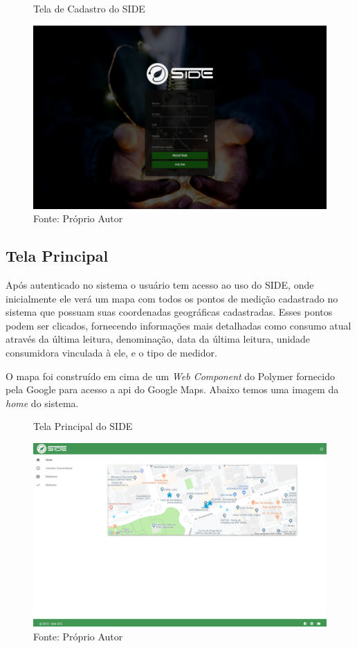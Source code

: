 \begin{figure}[H]
    \centering
    \caption{Tela de Cadastro do SIDE}
\includegraphics[width=0.7\linewidth]{imagens/side/side-cadastro.png}
    \caption*{Fonte: Próprio Autor}
    \label{fig:side-cadastro}
\end{figure}

\subsection{Tela Principal}

Após autenticado no sistema o usuário tem acesso ao uso do SIDE, onde inicialmente ele verá um mapa com todos os pontos de medição cadastrado no sistema que possuam suas coordenadas geográficas cadastradas. Esses pontos podem ser clicados, fornecendo informações mais detalhadas como consumo atual através da última leitura, denominação, data da última leitura, unidade consumidora vinculada à ele, e o tipo de medidor.

O mapa foi construído em cima de um \textit{Web Component} do Polymer fornecido pela Google para acesso a api do Google Maps. Abaixo temos uma imagem da \textit{home} do sistema.

\begin{figure}[H]
    \centering
    \caption{Tela Principal do SIDE}
\includegraphics[width=0.7\linewidth]{imagens/side/side-home.png}
    \caption*{Fonte: Próprio Autor}
    \label{fig:side-home}
\end{figure}


